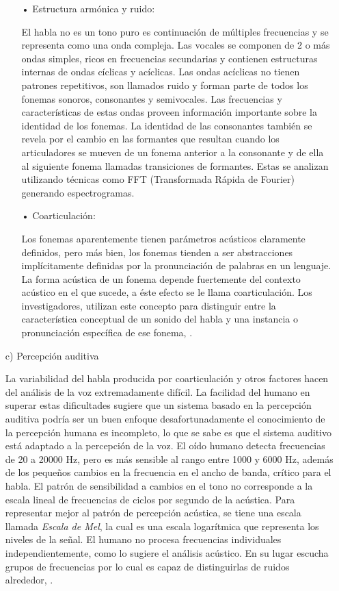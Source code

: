 \begin{enumerate}
\begin{enumerate}
\item[•]Estructura armónica y ruido:
\par
El habla no es un tono puro es continuación de múltiples frecuencias y se representa como una onda compleja. Las vocales se componen de 2 o más ondas simples, ricos en frecuencias secundarias y contienen estructuras internas de ondas cíclicas y acíclicas.
\vskip 0.5cm
Las ondas acíclicas no tienen patrones repetitivos, son llamados ruido y forman parte de todos los fonemas sonoros, consonantes y semivocales. Las frecuencias y características de estas ondas proveen información importante sobre la identidad de los fonemas.
\vskip 0.5cm
La identidad de las consonantes también se revela por el cambio en las formantes que resultan cuando los articuladores se mueven de un fonema anterior a la consonante y de ella al siguiente fonema llamadas transiciones de formantes. Estas se analizan utilizando técnicas como FFT (Transformada Rápida de Fourier) generando espectrogramas.

\item[•]Coarticulación:
\par
Los fonemas aparentemente tienen parámetros acústicos claramente definidos, pero más bien, los fonemas tienden a ser abstracciones implícitamente definidas por la pronunciación de palabras en un lenguaje. La forma acústica de un fonema depende fuertemente del contexto acústico en el que sucede, a éste efecto se le llama coarticulación. Los investigadores, utilizan este concepto para distinguir entre la característica conceptual de un sonido del habla y una instancia o pronunciación específica de ese fonema, \cite{franco}.
\end{enumerate}

\newpage
\item[c)]Percepción auditiva
\par
La variabilidad del habla producida por coarticulación y otros factores hacen del análisis de la voz extremadamente difícil. La facilidad del humano en superar estas dificultades sugiere que un sistema basado en la percepción auditiva podría ser un buen enfoque desafortunadamente el conocimiento de la percepción humana es incompleto, lo que se sabe es que el sistema auditivo está adaptado a la percepción de la voz.
\vskip 0.5cm
El oído humano detecta frecuencias de 20 a 20000 Hz, pero es más sensible al rango entre 1000 y 6000 Hz, además de los pequeños cambios en la frecuencia en el ancho de banda, crítico para el habla. El patrón de sensibilidad a cambios en el tono no corresponde a la escala lineal de frecuencias de ciclos por segundo de la acústica. Para representar mejor al patrón de percepción acústica, se tiene una escala llamada \textit{Escala de Mel}, la cual es una escala logarítmica que representa los niveles de la señal.
\vskip 0.5cm
El humano no procesa frecuencias individuales independientemente, como lo sugiere el análisis acústico. En su lugar escucha grupos de frecuencias por lo cual es capaz de distinguirlas de ruidos alrededor, \cite{eyra}.
\end{enumerate}

